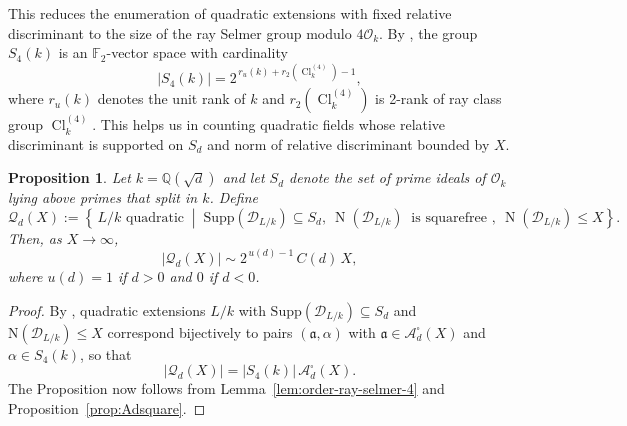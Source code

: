 \documentclass[11pt,reqno]{amsart}
\newcommand{\F}{\mathbb{F}}
\newcommand{\cA}{\mathcal{A}}
\newcommand{\cO}{\mathcal{O}}
\DeclareMathOperator{\Norm}{N}
\DeclareMathOperator{\Cl}{Cl}
\newtheorem{proposition}[theorem]{Proposition}
\theoremstyle{definition}
\theoremstyle{remark}
\begin{document}
\noindent
This reduces the enumeration of quadratic extensions with fixed
relative discriminant to the size of the ray Selmer group modulo $4\cO_k$.
By \cite[Proposition~3.9]{CDO02}, the group
$S_{4}(k)$ is an $\F_2$-vector space with cardinality
\begin{equation*}\label{lem:order-ray-selmer-4}
    |S_{4}(k)|=2^{\,r_u(k)+r_2(\Cl_k^{(4)})-1},
\end{equation*}
where $r_u(k)$ denotes the unit rank of $k$ and $r_2(\Cl_k^{(4)})$ is 2-rank of ray class group $\Cl_k^{(4)}$. This helps us in counting quadratic fields whose relative discriminant is supported on $S_d$ and norm of relative discriminant bounded by $X$.

\begin{proposition}\label{prop:Qd}
Let $k = \mathbb{Q}(\sqrt{d})$ and let $S_d$ denote the set of prime ideals 
of $\mathcal{O}_k$ lying above primes that split in $k$. Define
\[
\mathcal{Q}_d(X)
:=
\left\{
\, L/k \text{ quadratic} \;\middle|\;
\mathrm{Supp}(\mathcal{D}_{L/k}) \subseteq S_d,\ \Norm(\mathcal{D}_{L/k}) \  \text{ is squarefree },\
\Norm(\mathcal{D}_{L/k}) \le X
\right\}.
\]
Then, as $X \to \infty$,
\[
|\mathcal{Q}_d(X)| \sim 2^{\,u(d)-1}\, C(d)\, X,
\]
where $u(d) = 1$ if $d>0$ and $0$ if $d<0$.
\end{proposition}
\begin{proof}
By \cite[Proposition~3.9]{CDO02}, quadratic extensions $L/k$ with 
$\mathrm{Supp}(\mathcal{D}_{L/k}) \subseteq S_d$ and 
$\mathrm{N}(\mathcal{D}_{L/k}) \leq X$ correspond bijectively to pairs 
$(\mathfrak{a}, \alpha)$ with $\mathfrak{a} \in \mathcal{A}_d^\square(X)$ 
and $\alpha \in S_4(k)$, so that
\[
|\mathcal{Q}_d(X)| = |S_4(k)|\, \cA_d^\square(X).
\]
The Proposition now follows from Lemma~\ref{lem:order-ray-selmer-4} and 
Proposition~\ref{prop:Adsquare}.
\end{proof}
\medskip
\end{document}
